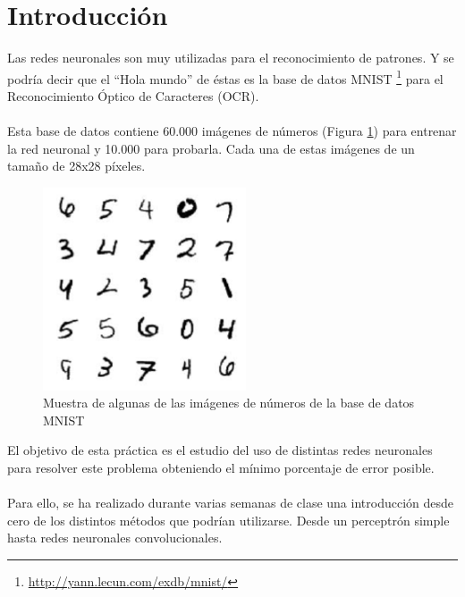 \newpage %

\tableofcontents %


\newpage


\section{Introducción}

Las redes neuronales son muy utilizadas para el reconocimiento de patrones. Y se podría decir que el ``Hola mundo'' de éstas es la base de datos MNIST \footnote{\url{http://yann.lecun.com/exdb/mnist/}} para el Reconocimiento Óptico de Caracteres (OCR).
\\ \\
Esta base de datos contiene 60.000 imágenes de números (Figura \ref{fig:sample-mnist-data}) para entrenar la red neuronal y 10.000 para probarla. Cada una de estas imágenes de un tamaño de 28x28 píxeles.
\begin{figure}[H]
	\centering
	\includegraphics[width=6cm]{img/sample-mnist-data}
	\caption{Muestra de algunas de las imágenes de números de la base de datos MNIST}
	\label{fig:sample-mnist-data}
\end{figure}
El objetivo de esta práctica es el estudio del uso de distintas redes neuronales para resolver este problema obteniendo el mínimo porcentaje de error posible.
\\ \\
Para ello, se ha realizado durante varias semanas de clase una introducción desde cero de los distintos métodos que podrían utilizarse. Desde un perceptrón simple hasta redes neuronales convolucionales.

